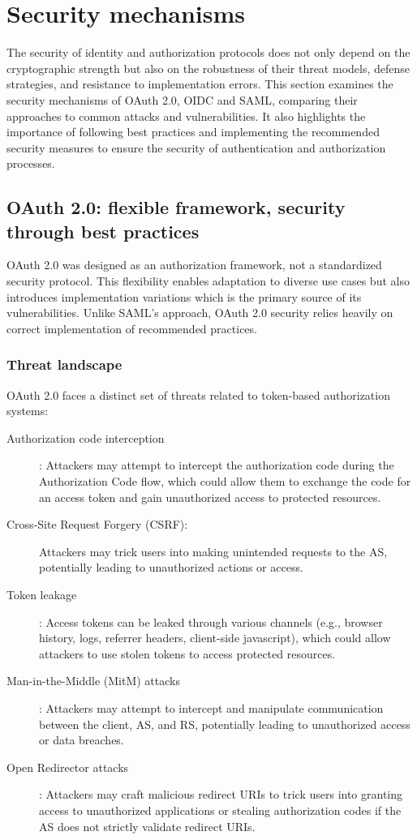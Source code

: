 \documentclass[../memoire.tex]{subfiles}
\begin{document}
\section{Security mechanisms}

The security of identity and authorization protocols does not only depend on the cryptographic strength but also on the robustness of their threat models, defense strategies, and resistance to implementation errors. This section examines the security mechanisms of OAuth 2.0, OIDC and SAML, comparing their approaches to common attacks and vulnerabilities. It also highlights the importance of following best practices and implementing the recommended security measures to ensure the security of authentication and authorization processes. 

\subsection{OAuth 2.0: flexible framework, security through best practices}

OAuth 2.0 was designed as an authorization framework, not a standardized security protocol. This flexibility enables adaptation to diverse use cases but also introduces implementation variations which is the primary source of its vulnerabilities. Unlike SAML's approach, OAuth 2.0 security relies heavily on correct implementation of recommended practices.

\subsubsection*{Threat landscape}

OAuth 2.0 faces a distinct set of threats related to token-based authorization systems:
\begin{description}
  \item[Authorization code interception]: Attackers may attempt to intercept the authorization code during the Authorization Code flow, which could allow them to exchange the code for an access token and gain unauthorized access to protected resources.
  \item[Cross-Site Request Forgery (CSRF):] Attackers may trick users into making unintended requests to the AS, potentially leading to unauthorized actions or access.
  \item[Token leakage]: Access tokens can be leaked through various channels (e.g., browser history, logs, referrer headers, client-side javascript), which could allow attackers to use stolen tokens to access protected resources.
  \item[Man-in-the-Middle (MitM) attacks]: Attackers may attempt to intercept and manipulate communication between the client, AS, and RS, potentially leading to unauthorized access or data breaches.
  \item[Open Redirector attacks]: Attackers may craft malicious redirect URIs to trick users into granting access to unauthorized applications or stealing authorization codes if the AS does not strictly validate redirect URIs.
\end{description}
\end{document}
